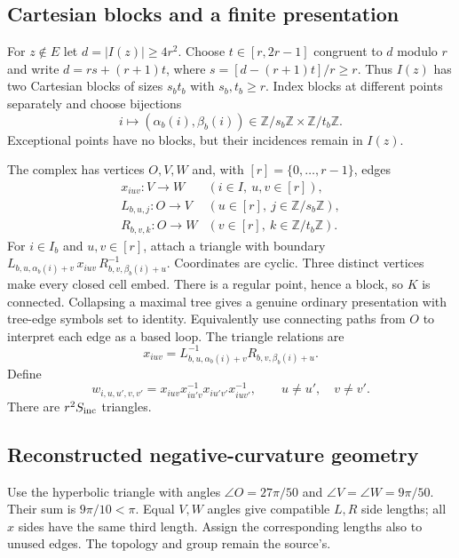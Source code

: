 \documentclass[11pt]{article}
\theoremstyle{definition}
\begin{document}
\subsection{Cartesian blocks and a finite presentation}
For $z\notin E$ let $d=|I(z)|\ge4r^2$.
Choose $t\in[r,2r-1]$ congruent to $d$ modulo $r$ and write
$d=rs+(r+1)t$, where
$s=[d-(r+1)t]/r\ge r$. Thus $I(z)$ has two Cartesian blocks of
sizes $s_bt_b$ with $s_b,t_b\ge r$. Index blocks at different points
separately and choose bijections
\[
 i\longmapsto(\alpha_b(i),\beta_b(i))
 \in\mathbb Z/s_b\mathbb Z\times\mathbb Z/t_b\mathbb Z.
\]
Exceptional points have no blocks, but their incidences remain in
$I(z)$.

The complex has vertices $O,V,W$ and, with $[r]=\{0,\ldots,r-1\}$,
edges
\[
 \begin{array}{ll}
 x_{iuv}:V\to W &(i\in I,\ u,v\in[r]),\\
 L_{b,u,j}:O\to V &(u\in[r],\ j\in\mathbb Z/s_b\mathbb Z),\\
 R_{b,v,k}:O\to W &(v\in[r],\ k\in\mathbb Z/t_b\mathbb Z).
 \end{array}
\]
For $i\in I_b$ and $u,v\in[r]$, attach a triangle with boundary
$L_{b,u,\alpha_b(i)+v}\,x_{iuv}\,R_{b,v,\beta_b(i)+u}^{-1}$.
Coordinates are cyclic. Three distinct vertices make every closed
cell embed. There is a regular point, hence a block, so $K$ is connected.
Collapsing a maximal tree gives a genuine ordinary presentation with
tree-edge symbols set to identity. Equivalently use connecting paths
from $O$ to interpret each edge as a based loop. The triangle relations
are
\begin{equation}\label{eq:triangles}
 x_{iuv}=L_{b,u,\alpha_b(i)+v}^{-1}R_{b,v,\beta_b(i)+u}.
\end{equation}
Define
\begin{equation}\label{eq:rectangles}
 w_{i,u,u',v,v'}=
 x_{iuv}x_{iu'v}^{-1}x_{iu'v'}x_{iuv'}^{-1},
 \qquad u\ne u',\quad v\ne v'.
\end{equation}
There are $r^2S_{\rm inc}$ triangles.

\subsection{Reconstructed negative-curvature geometry}
Use the hyperbolic triangle with angles
$\angle O=27\pi/50$ and $\angle V=\angle W=9\pi/50$.
Their sum is $9\pi/10<\pi$.
Equal $V,W$ angles give compatible $L,R$ side lengths; all $x$ sides
have the same third length. Assign the corresponding lengths also to
unused edges. The topology and group remain the source's.
\end{document}
